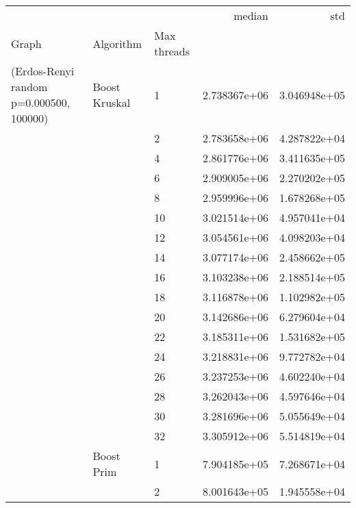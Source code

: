 \begin{tabular}{lllrr}
\toprule
                       &                    &    &        median &           std \\
Graph & Algorithm & Max threads &               &               \\
\midrule
(Erdos-Renyi random p=0.000500, 100000) & Boost Kruskal & 1  &  2.738367e+06 &  3.046948e+05 \\
                       &                    & 2  &  2.783658e+06 &  4.287822e+04 \\
                       &                    & 4  &  2.861776e+06 &  3.411635e+05 \\
                       &                    & 6  &  2.909005e+06 &  2.270202e+05 \\
                       &                    & 8  &  2.959996e+06 &  1.678268e+05 \\
                       &                    & 10 &  3.021514e+06 &  4.957041e+04 \\
                       &                    & 12 &  3.054561e+06 &  4.098203e+04 \\
                       &                    & 14 &  3.077174e+06 &  2.458662e+05 \\
                       &                    & 16 &  3.103238e+06 &  2.188514e+05 \\
                       &                    & 18 &  3.116878e+06 &  1.102982e+05 \\
                       &                    & 20 &  3.142686e+06 &  6.279604e+04 \\
                       &                    & 22 &  3.185311e+06 &  1.531682e+05 \\
                       &                    & 24 &  3.218831e+06 &  9.772782e+04 \\
                       &                    & 26 &  3.237253e+06 &  4.602240e+04 \\
                       &                    & 28 &  3.262043e+06 &  4.597646e+04 \\
                       &                    & 30 &  3.281696e+06 &  5.055649e+04 \\
                       &                    & 32 &  3.305912e+06 &  5.514819e+04 \\
                       & Boost Prim & 1  &  7.904185e+05 &  7.268671e+04 \\
                       &                    & 2  &  8.001643e+05 &  1.945558e+04 \\

\end{tabular}
